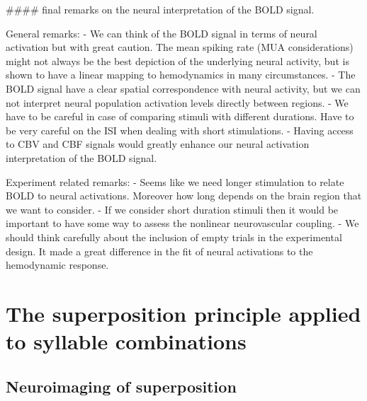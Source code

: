 #### final remarks on the neural interpretation of the BOLD signal.

General remarks:
- We can think of the BOLD signal in terms of neural activation but with great caution. The mean spiking rate (MUA considerations) might not always be the best depiction of the underlying neural activity, but is shown to have a linear mapping to hemodynamics in many circumstances.
- The BOLD signal have a clear spatial correspondence with neural activity, but we can not interpret neural population activation levels directly between regions.
- We have to be careful in case of comparing stimuli with different durations. Have to be very careful on the ISI when dealing with short stimulations.
- Having access to CBV and CBF signals would greatly enhance our neural activation interpretation of the BOLD signal.

Experiment related remarks:
- Seems like we need longer stimulation to relate BOLD to neural activations. Moreover how long depends on the brain region that we want to consider.
- If we consider short duration stimuli then it would be important to have some way to assess the nonlinear neurovascular coupling.
- We should think carefully about the inclusion of empty trials in the experimental design. It made a great difference in the fit of neural activations to the hemodynamic response.







\section{The superposition principle applied to syllable combinations}

\subsection{Neuroimaging of superposition}



